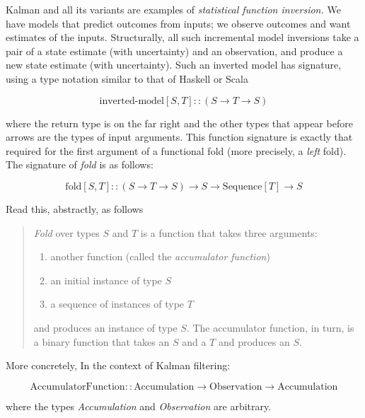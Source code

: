 \documentclass[10pt,oneside,x11names]{article}
\begin{document}
Kalman and all its variants are examples of \emph{statistical function inversion.} We
have models that predict outcomes from inputs; we observe outcomes and want
estimates of the inputs. Structurally, all such incremental model inversions
take a pair of a state estimate (with uncertainty) and an observation, and
produce a new state estimate (with uncertainty). Such an inverted model has
signature, using a type notation similar to that of Haskell or Scala

\begin{equation*}
\textrm{inverted-model}
\left[S,T\right]
::
\left(S\rightarrow{T}\rightarrow{S}\right)
\end{equation*}

\noindent where the
return type is on the far right and the other types that appear before arrows
are the types of input arguments.
This function signature is exactly that required for the first argument of a
functional fold (more precisely, a \emph{left} fold). The signature of \emph{fold} is as
follows:

\begin{equation*}
\textrm{fold}
\left[S,T\right]
::
\left(S\rightarrow{T}\rightarrow{S}\right)
\rightarrow{S}
\rightarrow{\textrm{Sequence}\left[T\right]}
\rightarrow{S}
\end{equation*}

Read this, abstractly, as follows

\begin{quote}
\emph{Fold} over types \(S\) and \(T\) is a function that
takes three arguments:
\begin{enumerate}
\item another function (called the \emph{accumulator function})
\item an initial instance of type \(S\)
\item a sequence of instances of type \(T\)
\end{enumerate}
and produces an instance of type \(S\). The
accumulator function, in turn, is a binary function that takes an \(S\) and a \(T\) and
produces an \(S\).
\end{quote}

More concretely, In the context of Kalman filtering:

\begin{equation*}
\text{AccumulatorFunction}
::
\text{Accumulation}
\rightarrow
\text{Observation}
\rightarrow
\text{Accumulation}
\end{equation*}

\noindent where the types \emph{Accumulation} and \emph{Observation} are arbitrary. 
\end{document}
